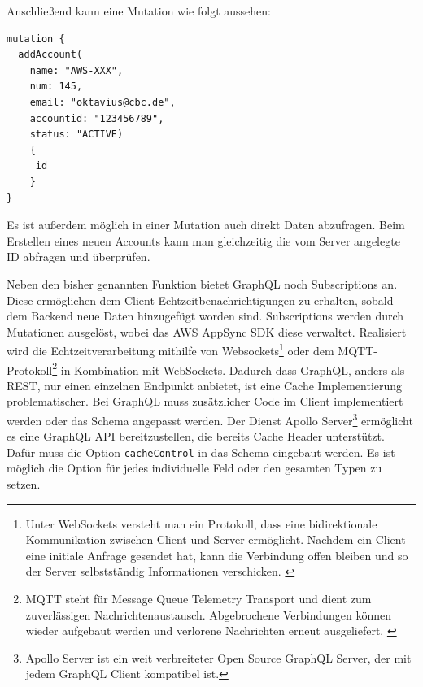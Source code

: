 Anschließend kann eine Mutation wie folgt aussehen:

\begin{lstlisting}[basicstyle=\ttfamily, breaklines=true , frame = single, backgroundcolor=\color{flashwhite} ]
mutation {
  addAccount(
    name: "AWS-XXX",
    num: 145,
    email: "oktavius@cbc.de",
    accountid: "123456789",
    status: "ACTIVE)
    {
     id
    }
}
\end{lstlisting}

Es ist außerdem möglich in einer Mutation auch direkt Daten abzufragen. Beim Erstellen eines neuen Accounts kann man gleichzeitig die
vom Server angelegte ID abfragen und überprüfen.\cite{GraphQL1}

Neben den bisher genannten Funktion bietet GraphQL noch Subscriptions an.
Diese ermöglichen dem Client Echtzeitbenachrichtigungen zu erhalten, sobald dem Backend neue Daten hinzugefügt worden sind.
Subscriptions werden durch Mutationen ausgelöst, wobei das AWS AppSync SDK diese verwaltet.
Realisiert wird die Echtzeitverarbeitung mithilfe von Websockets\footnote{Unter WebSockets versteht man ein Protokoll, dass eine bidirektionale Kommunikation zwischen Client und Server ermöglicht. Nachdem ein Client eine initiale Anfrage gesendet hat, kann die Verbindung offen bleiben und so der Server selbstständig Informationen verschicken. \cite{Websockets}}
oder dem MQTT-Protokoll\footnote{MQTT steht für Message Queue Telemetry Transport und dient zum zuverlässigen Nachrichtenaustausch. Abgebrochene Verbindungen können wieder aufgebaut werden und verlorene Nachrichten erneut ausgeliefert. \cite{MQTT} } in Kombination mit WebSockets. \cite{GraphQLSubs}
Dadurch dass GraphQL, anders als REST, nur einen einzelnen Endpunkt anbietet, ist eine Cache Implementierung problematischer.
Bei GraphQL muss zusätzlicher Code im Client implementiert werden oder das Schema angepasst werden.
Der Dienst Apollo Server\footnote{Apollo Server ist ein weit verbreiteter Open Source GraphQL Server, der mit jedem GraphQL Client kompatibel ist.} ermöglicht es
eine GraphQL API bereitzustellen, die bereits Cache Header unterstützt.
Dafür muss die Option \verb+cacheControl+ in das Schema eingebaut werden.
Es ist möglich die Option für jedes individuelle Feld oder den gesamten Typen zu setzen. \cite{Apollo}
\cite{GraphQL} \cite{GraphQL1}


